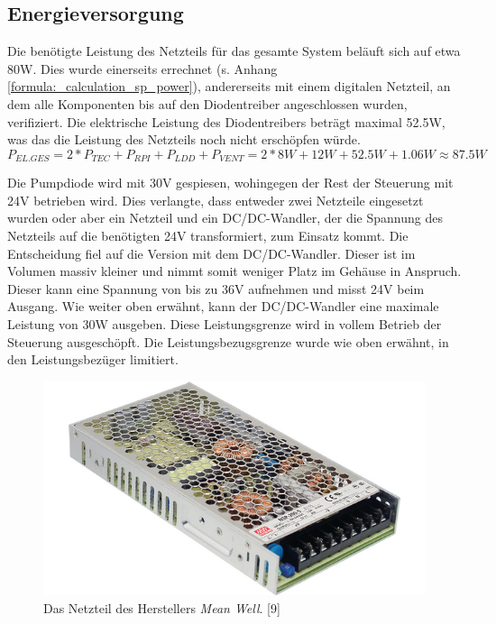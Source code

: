 \subsection{Energieversorgung}
Die benötigte Leistung des Netzteils für das gesamte System beläuft sich auf etwa 80W. Dies wurde einerseits errechnet (s. Anhang \ref{formula:_calculation_sp_power}), andererseits mit einem digitalen Netzteil, an dem alle Komponenten bis auf den Diodentreiber angeschlossen wurden, verifiziert. Die elektrische Leistung des Diodentreibers beträgt maximal 52.5W, was das die Leistung des Netzteils noch nicht erschöpfen würde.\\
\begin{equation}
P_{EL.GES} = 2*P_{TEC}+P_{RPI}+P_{LDD}+P_{VENT} = 2*8W+12W+52.5W+1.06W \approx 87.5W
    \label{formula:_calculation_sp_power}
\end{equation}

Die Pumpdiode wird mit 30V gespiesen, wohingegen der Rest der Steuerung mit 24V betrieben wird. Dies verlangte, dass entweder zwei Netzteile eingesetzt wurden oder aber ein Netzteil und ein DC/DC-Wandler, der die Spannung des Netzteils auf die benötigten 24V transformiert, zum Einsatz kommt. Die Entscheidung fiel auf die Version mit dem DC/DC-Wandler. Dieser ist im Volumen massiv kleiner und nimmt somit weniger Platz im Gehäuse in Anspruch. Dieser kann eine Spannung von bis zu 36V aufnehmen und misst 24V beim Ausgang. Wie weiter oben erwähnt, kann der DC/DC-Wandler eine maximale Leistung von 30W ausgeben. Diese Leistungsgrenze wird in vollem Betrieb der Steuerung ausgeschöpft. Die Leistungsbezugsgrenze wurde wie oben erwähnt, in den Leistungsbezüger limitiert.

\begin{figure}[H]
    \centering
    \includegraphics[scale=0.35]{98_images/schaltnetzteile-200-w-pfc.jpg}
    \caption{Das Netzteil des Herstellers \textit{Mean Well}. [9]}
    \label{fig:controller_ps_hw}
\end{figure}


